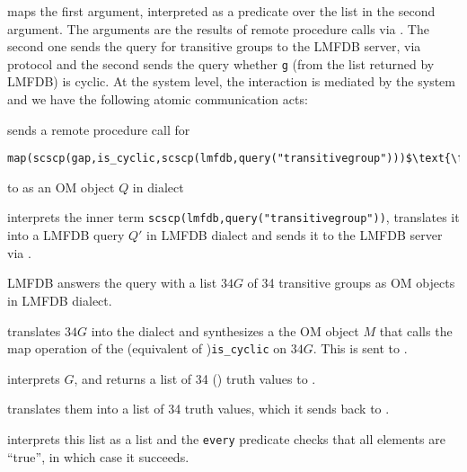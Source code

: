 \begin{oldpart}
 maps the first argument, interpreted as a predicate over the list in the second argument.
The arguments are the results of remote procedure calls via \SCSCP. 
The second one sends the query for transitive groups to the LMFDB \SCSCP server, via \SCSCP protocol and the second sends the query whether \lstinline|g| (from the list returned by LMFDB) is cyclic.
At the system level, the interaction is mediated by the \MMT system and we have the following atomic communication acts: 
\begin{compactenum}
\item \Sage sends a \SCSCP remote procedure call for 
  \begin{lstlisting}[mathescape]
    map(scscp(gap,is_cyclic,scscp(lmfdb,query("transitivegroup")))$\text{\footnotemark}$
\end{lstlisting}
    to \MMT as an OM object $Q$ in \Sage
  dialect
\item \MMT interprets the inner term \lstinline|scscp(lmfdb,query("transitivegroup"))|, translates it into a LMFDB query $Q'$ in LMFDB dialect and sends it to the LMFDB \SCSCP server via \SCSCP. 
\item LMFDB answers the query with a list $34G$ of 34 transitive groups as OM objects in LMFDB dialect.
\item \MMT translates $34G$ into the \GAP dialect and synthesizes a the OM object $M$ that calls the \GAP map operation of the (\GAP equivalent of )\lstinline|is_cyclic| on $34G$. This is sent to \GAP. 
\item \GAP interprets $G$, and returns a list of 34 (\GAP) truth values to \MMT. 
\item \MMT translates them into a list of 34 \Sage truth values, which it sends back to \Sage. 
\item \Sage interprets this list as a \Sage list and the \lstinline|every| predicate checks that all elements are ``true'', in which case it succeeds. 
\end{compactenum}
\end{oldpart}

